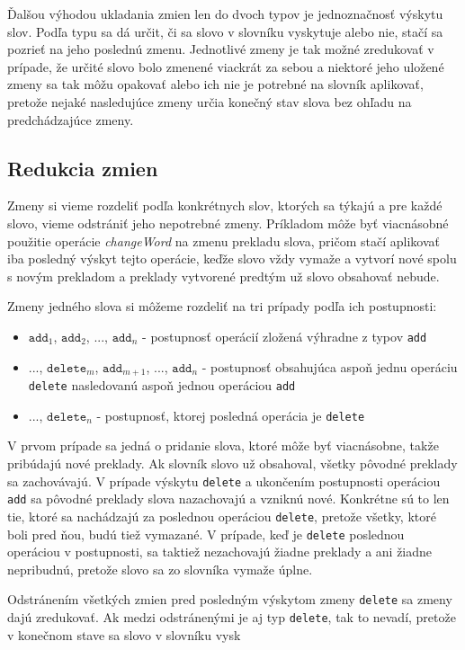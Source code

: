 \documentclass[
  digital, %
  table,   %
  lof,     %
  lot,     %
]{fithesis3}
\begin{document}
Ďalšou výhodou ukladania zmien len do dvoch typov je jednoznačnosť výskytu slov. Podľa typu sa dá určit, či sa slovo v slovníku vyskytuje alebo nie, stačí sa pozrieť na jeho poslednú zmenu. Jednotlivé zmeny je tak možné zredukovať v prípade, že určité slovo bolo zmenené viackrát za sebou a niektoré jeho uložené zmeny sa tak môžu opakovať alebo ich nie je potrebné na slovník aplikovať, pretože nejaké nasledujúce zmeny určia konečný stav slova bez ohľadu na predchádzajúce zmeny.

\subsection{Redukcia zmien}
Zmeny si vieme rozdeliť podľa konkrétnych slov, ktorých sa týkajú a pre každé slovo, vieme odstrániť jeho nepotrebné zmeny. Príkladom môže byť viacnásobné použitie operácie \textit{changeWord} na zmenu prekladu slova, pričom stačí aplikovať iba posledný výskyt tejto operácie, keďže slovo vždy vymaže a vytvorí nové spolu s novým prekladom a preklady vytvorené predtým už slovo obsahovať nebude.

Zmeny jedného slova si môžeme rozdeliť na tri prípady podľa ich postupnosti:
\begin{itemize}
\item $\texttt{add}_1$, $\texttt{add}_2$, ..., $\texttt{add}_n$ - postupnosť operácií zložená výhradne z typov \texttt{add}
\item ..., $\texttt{delete}_{m}$, $\texttt{add}_{m+1}$, ..., $\texttt{add}_n$ - postupnosť obsahujúca aspoň jednu operáciu \texttt{delete} nasledovanú aspoň jednou operáciou \texttt{add}
\item ..., $\texttt{delete}_{n}$ - postupnosť, ktorej posledná operácia je \texttt{delete}
\end{itemize}

V prvom prípade sa jedná o pridanie slova, ktoré môže byť viacnásobne, takže pribúdajú nové preklady. Ak slovník slovo už obsahoval, všetky pôvodné preklady sa zachovávajú. V prípade výskytu \texttt{delete} a ukončením postupnosti operáciou \texttt{add} sa pôvodné preklady slova nazachovajú a vzniknú nové. Konkrétne sú to len tie, ktoré sa nachádzajú za poslednou operáciou \texttt{delete}, pretože všetky, ktoré boli pred ňou, budú tiež vymazané. V prípade, keď je \texttt{delete} poslednou operáciou v postupnosti, sa taktiež nezachovajú žiadne preklady a ani žiadne nepribudnú, pretože slovo sa zo slovníka vymaže úplne.

Odstránením všetkých zmien pred posledným výskytom zmeny \texttt{delete} sa zmeny dajú zredukovať. Ak medzi odstránenými je aj typ \texttt{delete}, tak to nevadí, pretože v konečnom stave sa slovo v slovníku vysk
\end{document}
